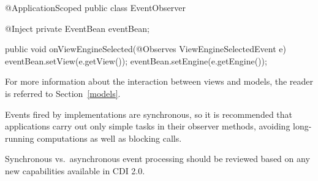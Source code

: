 \begin{listing}{1}
@ApplicationScoped
public class EventObserver {

    @Inject
    private EventBean eventBean;

    public void onViewEngineSelected(@Observes ViewEngineSelectedEvent e) {
        eventBean.setView(e.getView());
        eventBean.setEngine(e.getEngine());
    }
}
\end{listing}

For more information about the interaction between views and models, the reader
is referred to Section~\ref{models}. 

Events fired by implementations are synchronous,
so it is recommended that applications carry out only simple tasks in 
their observer methods, avoiding long-running computations as well as blocking calls.

\begin{ednote}
Synchronous vs.~asynchronous event processing should be reviewed 
based on any new capabilities available in CDI 2.0.
\end{ednote}
